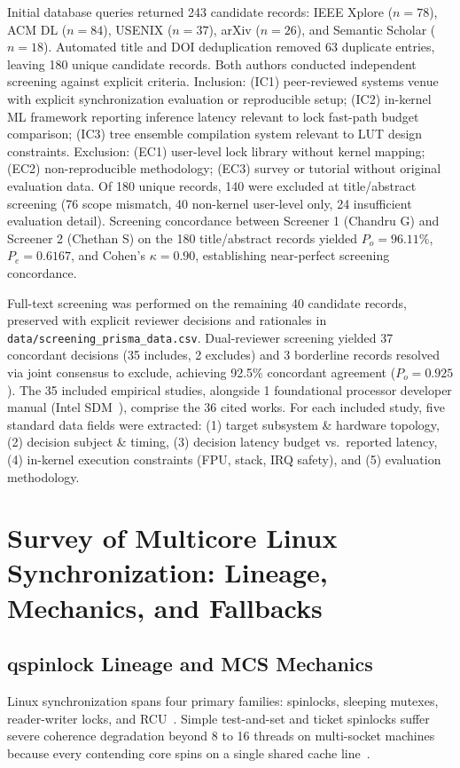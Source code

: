 \documentclass[conference]{IEEEtran}
\begin{document}
Initial database queries returned 243 candidate records: IEEE Xplore ($n = 78$), ACM DL ($n = 84$), USENIX ($n = 37$), arXiv ($n = 26$), and Semantic Scholar ($n = 18$). Automated title and DOI deduplication removed 63 duplicate entries, leaving 180 unique candidate records. Both authors conducted independent screening against explicit criteria. Inclusion: (IC1) peer-reviewed systems venue with explicit synchronization evaluation or reproducible setup; (IC2) in-kernel ML framework reporting inference latency relevant to lock fast-path budget comparison; (IC3) tree ensemble compilation system relevant to LUT design constraints. Exclusion: (EC1) user-level lock library without kernel mapping; (EC2) non-reproducible methodology; (EC3) survey or tutorial without original evaluation data. Of 180 unique records, 140 were excluded at title/abstract screening (76 scope mismatch, 40 non-kernel user-level only, 24 insufficient evaluation detail). Screening concordance between Screener 1 (Chandru G) and Screener 2 (Chethan S) on the 180 title/abstract records yielded $P_o = 96.11\%$, $P_e = 0.6167$, and Cohen's $\kappa = 0.90$, establishing near-perfect screening concordance.

Full-text screening was performed on the remaining 40 candidate records, preserved with explicit reviewer decisions and rationales in \texttt{data/screening\_prisma\_data.csv}. Dual-reviewer screening yielded 37 concordant decisions (35 includes, 2 excludes) and 3 borderline records resolved via joint consensus to exclude, achieving 92.5\% concordant agreement ($P_o = 0.925$). The 35 included empirical studies, alongside 1 foundational processor developer manual (Intel SDM~\cite{intel2024sdm}), comprise the 36 cited works. For each included study, five standard data fields were extracted: (1) target subsystem \& hardware topology, (2) decision subject \& timing, (3) decision latency budget vs.\ reported latency, (4) in-kernel execution constraints (FPU, stack, IRQ safety), and (5) evaluation methodology.

\section{Survey of Multicore Linux Synchronization: Lineage, Mechanics, and Fallbacks}

\subsection{qspinlock Lineage and MCS Mechanics}
Linux synchronization spans four primary families: spinlocks, sleeping mutexes, reader-writer locks, and RCU~\cite{mckenney2021parallel,cho2022survey}. Simple test-and-set and ticket spinlocks suffer severe coherence degradation beyond 8 to 16 threads on multi-socket machines because every contending core spins on a single shared cache line~\cite{david2013everything,rajwar2001speculative}.
\end{document}
